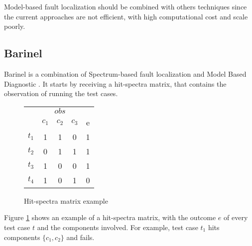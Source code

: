 Model-based fault localization should be combined with others techniques since
the current approaches are not efficient, with high computational cost and scale
poorly.

\subsection{Barinel}
Barinel is a combination of Spectrum-based fault localization and Model Based
Diagnostic \cite{Abreu:2009:SMF:1747491.1747511}. It starts by receiving a
hit-spectra matrix, that contains the observation of running the test cases.

\newcommand{\pr}{\mbox{Pr}}
\newcommand{\likelihood}{\pr(obs_i, e_i \mid d)}
\newcommand{\gFunc}[1][d]{\displaystyle\prod_{j \in (d \cap obs_i)} g_j}

\begin{figure}[h]
  \begin{center}
    \begin{tabular}{c|ccc|c}
    	& \multicolumn{3}{|c|}{$obs$} &      \\
      & $c_1$ & $c_2$ & $c_3$ & e     \\ \hline
      $t_1$ & 1     & 1     & 0     & 1     \\
      $t_2$ & 0     & 1     & 1     & 1     \\
      $t_3$ & 1     & 0     & 0     & 1     \\
      $t_4$ & 1     & 0     & 1     & 0     \\
    \end{tabular}
  \end{center}
  \caption{Hit-spectra matrix example}
  \label{figure:hit_spectra}
\end{figure}

Figure \ref{figure:hit_spectra} shows an example of a hit-spectra matrix, with
the outcome $e$ of every test case $t$ and the components involved. For example,
test case $t_1$ hits components $\{c_1, c_2\}$ and fails.

